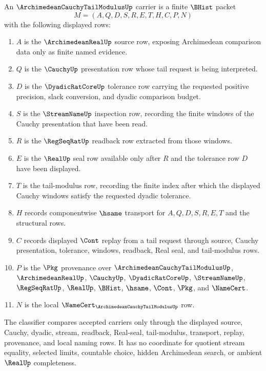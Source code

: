 \begin{definition}
\label{def:archimedean-cauchy-tail-modulus-carrier}
An $\ArchimedeanCauchyTailModulusUp$ carrier is a finite $\BHist$ packet
$$
M=(A,Q,D,S,R,E,T,H,C,P,N)
$$
with the following displayed rows:
\begin{enumerate}
\item $A$ is the $\ArchimedeanRealUp$ source row, exposing Archimedean comparison data only as finite named evidence.
\item $Q$ is the $\CauchyUp$ presentation row whose tail request is being interpreted.
\item $D$ is the $\DyadicRatCoreUp$ tolerance row carrying the requested positive precision, slack conversion, and dyadic comparison budget.
\item $S$ is the $\StreamNameUp$ inspection row, recording the finite windows of the Cauchy presentation that have been read.
\item $R$ is the $\RegSeqRatUp$ readback row extracted from those windows.
\item $E$ is the $\RealUp$ seal row available only after $R$ and the tolerance row $D$ have been displayed.
\item $T$ is the tail-modulus row, recording the finite index after which the displayed Cauchy windows satisfy the requested dyadic tolerance.
\item $H$ records componentwise $\hsame$ transport for $A,Q,D,S,R,E,T$ and the structural rows.
\item $C$ records displayed $\Cont$ replay from a tail request through source, Cauchy presentation, tolerance, windows, readback, Real seal, and tail-modulus rows.
\item $P$ is the $\Pkg$ provenance over $\ArchimedeanCauchyTailModulusUp$, $\ArchimedeanRealUp$, $\CauchyUp$, $\DyadicRatCoreUp$, $\StreamNameUp$, $\RegSeqRatUp$, $\RealUp$, $\BHist$, $\hsame$, $\Cont$, $\Pkg$, and $\NameCert$.
\item $N$ is the local $\NameCert_{\ArchimedeanCauchyTailModulusUp}$ row.
\end{enumerate}
The classifier compares accepted carriers only through the displayed source, Cauchy, dyadic, stream, readback, Real-seal, tail-modulus, transport, replay, provenance, and local naming rows. It has no coordinate for quotient stream equality, selected limits, countable choice, hidden Archimedean search, or ambient $\RealUp$ completeness.
\end{definition}

